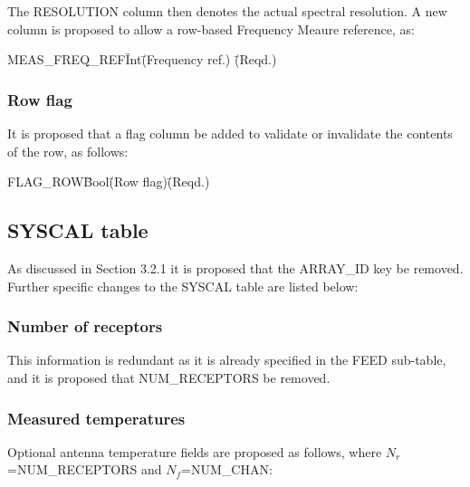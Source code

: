 \documentclass{article}
\newcommand{\nr}{$N_r$}
\newcommand{\nf}{$N_f$}
\begin{document}
\begin{itemize}
The RESOLUTION column then denotes the actual spectral resolution.  A
new column is proposed to allow a row-based Frequency Meaure
reference, as:

\begin{tabbing}
MEAS\_FREQ\_REF\quad\quad \= Int\quad\quad \= (Frequency ref.)\quad\quad 
 \= (Reqd.) \\
\end{tabbing}

\subsubsection{Row flag}

It is proposed that a flag column be added to validate or invalidate
the contents of the row, as follows:

\begin{tabbing}
FLAG\_ROW\quad\quad \= Bool\quad\quad \= (Row flag)\quad\quad \= (Reqd.)\\
\end{tabbing}

\subsection{SYSCAL table}

As discussed in Section 3.2.1 it is proposed that the ARRAY\_ID key be
removed.  Further specific changes to the SYSCAL table are listed
below:

\subsubsection{Number of receptors}

This information is redundant as it is already specified in the FEED
sub-table, and it is proposed that NUM\_RECEPTORS be removed.

\subsubsection{Measured temperatures}

Optional antenna temperature fields are proposed as follows, where
\nr=NUM\_RECEPTORS and \nf=NUM\_CHAN:


\end{itemize}
\end{document}
